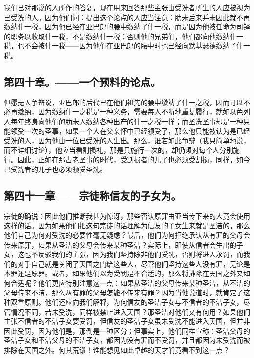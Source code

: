 我们已对那说的人所作的答复，现在用来回答那些主张由受洗者所生的人应被视为已受洗的人。因为他们问：提出这个论点的人应当注意：肋未后来并未因此就不再缴纳什一税，因为他已经在亚巴郎的腰中缴纳了什一税，而是因为他被任命为司铎的职务以收取什一税，不是缴纳什一税；否则他的兄弟们，他们都向他缴纳什一税，也不会被什一税——因为他们在亚巴郎的腰中时也已经向默基瑟德缴纳了什一税。\par


\subsection{第四十章。——一个预料的论点。}

但愿无人争辩说，亚巴郎的后代已在他们祖先的腰中缴纳了什一之税，因而可以不必再缴纳，因为缴纳什一之税是一种义务，需要每人不断地重复履行，就如以色列人每年终身向他们的肋未人缴纳各种出产的什一之税一样；而圣洗圣事却是一种只能领受一次的圣事，如果一个人在父亲怀中已经领受了，那么他只能被认为是已经受洗的人，因为他由一位已受洗的人生出。那么，谁若如此争辩（我只简单地说，而不详细讨论），他应当看割损礼，那是只施行一次的，却仍须对每个人分别施行。因此，正如在那古老圣事的时代，受割损者的儿子也必须受割损，同样，如今已受洗者的儿子也必须领受圣洗。\par


\subsection{第四十一章——宗徒称信友的子女为。}

宗徒的确说：因此他们推断我甚为惊讶，那些否认原罪由亚当传下来的人竟会使用这样的话。因为如果他们把这句宗徒的话理解为信友的子女生来就是圣洁的，那么他们自己为何对受洗的必要性毫无疑虑？最后，他们为何拒绝承认从有罪的父母会传来原罪，如果从圣洁的父母会传来某种圣洁？实际上，即使从信者会生出的子女，这也不反驳我们的主张，因为我们坚持除非他们受洗，否则将进入永罚，而我们的对手自己就是关闭了天国之门给这些人，尽管他们坚持这些人没有罪，无论是本罪还是原罪。或者，如果他们以为受罚是不合适的，那么将排除在天国之外又如何合适呢？他们更应特别注意这一点：如果从圣洁的父母传来某种圣洁，从不洁的父母传来不洁，那么从有罪的父母怎能不传来有罪？因为当他说道时，就肯定了这种双重原则。他们还应向我们解释，为何信友的圣洁子女与不信者的不洁子女，尽管情况不同，若未受洗，同样被禁止进入天国？那圣洁对他们又有何用？如果他们主张不信者的不洁子女要受罚，但信友的圣洁子女虽未受洗不能进入天国，但并非因此受罚，因为他们是，那倒是一种区分；但事实上，他们同样宣称：圣洁父母的圣洁子女和不洁父母的不洁子女，都因为没有罪而不受罚，并且都因为未受洗而被排除在天国之外。何其荒谬！谁能想见如此卓越的天才们竟看不到这一点？\par

